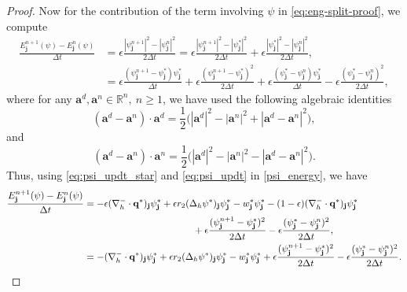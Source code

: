 \documentclass[11pt]{article}
\numberwithin{equation}{section}
\newtheorem{counter example}[theorem]{Counter Example}
\numberwithin{equation}{section}
\numberwithin{equation}{section}
\begin{document}
\begin{proof}
Now for the contribution of the term involving $\psi$ in \eqref{eq:eng-split-proof}, we compute
\begin{align}\label{psi_energy}
\frac{E_{\mathbf{j}}^{n+1}(\psi)-E_{\mathbf{j}}^{n}(\psi)}{\Delta t}&=\epsilon\frac{|\psi_{\mathbf{j}}^{n+1}|^2-|\psi^n_{\mathbf{j}}|^2}{2\Delta t}=\epsilon\frac{|\psi_{\mathbf{j}}^{n+1}|^2-|\psi^*_{\mathbf{j}}|^2}{2\Delta t}+\epsilon\frac{|\psi^*_{\mathbf{j}}|^2-|\psi^n_{\mathbf{j}}|^2}{2\Delta t},\nonumber\\
&=\epsilon\frac{(\psi_{\mathbf{j}}^{n+1}-\psi^*_{\mathbf{j}})\psi^*_{\mathbf{j}}}{\Delta t}+\epsilon\frac{(\psi_{\mathbf{j}}^{n+1}-\psi^*_{\mathbf{j}})^2}{2\Delta t}+\epsilon\frac{(\psi^*_{\mathbf{j}}-\psi^n_{\mathbf{j}})\psi^*_{\mathbf{j}}}{\Delta t}-\epsilon\frac{(\psi^*_{\mathbf{j}}-\psi^n_{\mathbf{j}})^2}{2\Delta t},
\end{align}
where for any $\mathbf{a}^d,\mathbf{a}^n\in \mathbb{R}^n, ~n\geq 1$, we have used the following algebraic identities
\begin{equation}\label{eq: square_identity_1}
(\mathbf{a}^d-\mathbf{a}^n)\cdot \mathbf{a}^d=\frac12\Big(|\mathbf{a}^d|^2-|\mathbf{a}^n|^2+|\mathbf{a}^d-\mathbf{a}^n|^2\Big),
\end{equation}
and 
\begin{equation}\label{eq: square_identity_2}
(\mathbf{a}^d-\mathbf{a}^n)\cdot \mathbf{a}^n=\frac12\Big(|\mathbf{a}^d|^2-|\mathbf{a}^n|^2-|\mathbf{a}^d-\mathbf{a}^n|^2\Big).
\end{equation}
Thus, using \eqref{eq:psi_updt_star} and \eqref{eq:psi_updt} in \eqref{psi_energy}, we have
\begin{equation}
\begin{aligned}
\label{eq:psi-energy-proof}
\frac{E_{\mathbf{j}}^{n+1}(\psi)-E_{\mathbf{j}}^{n}(\psi)}{\Delta t}&=-\epsilon(\nabla_h^{-} \cdot \mathbf{q}^*)_{\mathbf{j}}\psi^*_{\mathbf{j}}+\epsilon r_2(\Delta_h \psi^*)_{\mathbf{j}}\psi^*_{\mathbf{j}}-w^*_{\mathbf{j}}\psi^*_{\mathbf{j}}-(1-\epsilon)(\nabla_h^{-} \cdot \mathbf{q}^*)_{\mathbf{j}}\psi^*_{\mathbf{j}}\\
&\hspace{ 4 cm}+\epsilon\frac{(\psi_{\mathbf{j}}^{n+1}-\psi^*_{\mathbf{j}})^2}{2\Delta t}-\epsilon\frac{(\psi^*_{\mathbf{j}}-\psi^n_{\mathbf{j}})^2}{2\Delta t},\\
&=-(\nabla_h^{-} \cdot \mathbf{q}^*)_{\mathbf{j}}\psi^*_{\mathbf{j}}+\epsilon r_2(\Delta_h \psi^*)_{\mathbf{j}}\psi^*_{\mathbf{j}}-w^*_{\mathbf{j}}\psi^*_{\mathbf{j}}+\epsilon\frac{(\psi_{\mathbf{j}}^{n+1}-\psi^*_{\mathbf{j}})^2}{2\Delta t}-\epsilon\frac{(\psi^*_{\mathbf{j}}-\psi^n_{\mathbf{j}})^2}{2\Delta t}.

\end{aligned}
\end{equation}
\end{proof}
\end{document}
